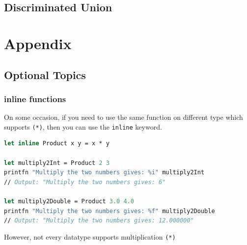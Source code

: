 \documentclass[12pt]{article}
\begin{document}
\subsection{Discriminated Union}
































\pagebreak

\appendix
\section{Appendix}

\subsection{Optional Topics}
\subsubsection{inline functions}
On some occasion, if you need to use the same function on different type which supports \texttt{(*)}, then you can use the \texttt{inline} keyword.
\begin{lstlisting}[language=FSharp]
let inline Product x y = x * y

let multiply2Int = Product 2 3
printfn "Multiply the two numbers gives: %i" multiply2Int
// Output: "Multiply the two numbers gives: 6"

let multiply2Double = Product 3.0 4.0
printfn "Multiply the two numbers gives: %f" multiply2Double
// Output: "Multiply the two numbers gives: 12.000000"
\end{lstlisting}
However, not every datatype supports multiplication \texttt{(*)}
\end{document}
